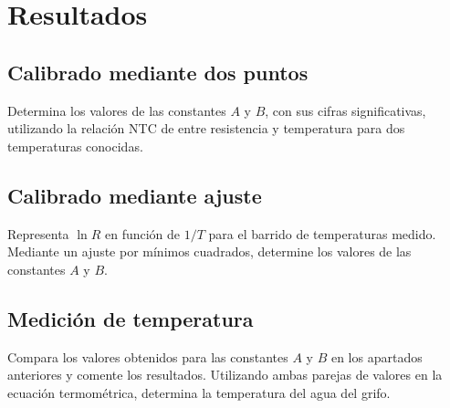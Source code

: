 
\def\numeroPractica{10}                       %
\def\tituloPractica{Calibrado de termistores} %

\def\fechaPractica{dd/mm/aaaa} %
\def\fechaEntrega{dd/mm/aaaa}  %

\maketitle

\section{Resultados}

\subsection{Calibrado mediante dos puntos}

Determina los valores de las constantes $A$ y $B$, con sus cifras significativas, utilizando la relación NTC de entre resistencia y temperatura para dos temperaturas conocidas.

\subsection{Calibrado mediante ajuste}

Representa $\ln R$ en función de $1/T$ para el barrido de temperaturas medido. Mediante un ajuste por mínimos cuadrados, determine los valores de las constantes $A$ y $B$.

\subsection{Medición de temperatura}

Compara los valores obtenidos para las constantes $A$ y $B$ en los apartados anteriores y comente los resultados. Utilizando ambas parejas de valores en la ecuación termométrica, determina la temperatura del agua del grifo.


